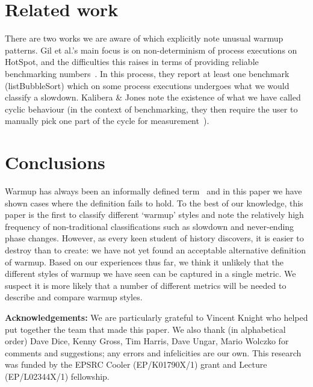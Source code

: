 \documentclass[preprint,numbers,10pt]{sigplanconf}
\newcommand{\kalibera}{Kalibera \& Jones\xspace}
\begin{document}
\section{Related work}


There are two works we are aware of which explicitly note unusual warmup
patterns. Gil et al.'s main focus is on non-determinism of process executions on
HotSpot, and the difficulties this raises in terms of providing reliable
benchmarking numbers~\cite{gil11microbenchmark}. In this process, they report at
least one benchmark (listBubbleSort) which on some process executions undergoes what we
would classify a slowdown. \kalibera note the
existence of what we have called cyclic behaviour (in the context of benchmarking,
they then require the user to
manually pick one part of the cycle for measurement~\cite{kalibera13rigorous}).


\section{Conclusions}
\label{sec:conclusion}

Warmup has always been an informally defined term~\cite{seaton15phd} and in this
paper we have shown cases where the definition fails to hold.
To the best of our knowledge, this paper is the first to classify different
`warmup' styles and note the relatively high frequency of non-traditional
classifications such as slowdown and never-ending phase changes.
However, as every keen student of history discovers, it is easier to destroy than to
create: we have not yet found an acceptable alternative definition of warmup.
Based on our experiences thus far, we think it unlikely that the different
styles of warmup we have seen can be captured in a single metric. We suspect it
is more likely that a number of different metrics will be needed to describe and
compare warmup styles.

\textbf{Acknowledgements:} We are particularly grateful to Vincent Knight
who helped put together the team that made this paper. We also thank (in alphabetical order) Dave Dice, Kenny
Gross, Tim Harris, Dave Ungar, Mario Wolczko for comments and suggestions; any
errors and infelicities are our own. This research was funded by the EPSRC
Cooler (EP/K01790X/1) grant and Lecture (EP/L02344X/1) fellowship.



\end{document}
